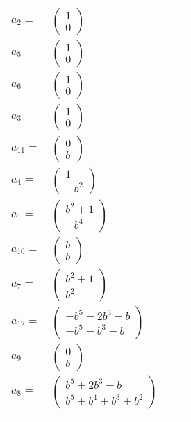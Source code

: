 \documentclass[1p]{elsarticle_modified}
\theoremstyle{definition}
\begin{document}
\begin{tabular}{m{7pt} m{180pt} m{7pt} m{180pt} }
\flushright $a_{2}=$&$\begin{pmatrix}1\\0\end{pmatrix}$ \\
\flushright $a_{5}=$&$\begin{pmatrix}1\\0\end{pmatrix}$ \\
\flushright $a_{6}=$&$\begin{pmatrix}1\\0\end{pmatrix}$ \\
\flushright $a_{3}=$&$\begin{pmatrix}1\\0\end{pmatrix}$ \\
\flushright $a_{11}=$&$\begin{pmatrix}0\\b\end{pmatrix}$ \\
\flushright $a_{4}=$&$\begin{pmatrix}1\\- b^2\end{pmatrix}$ \\
\flushright $a_{1}=$&$\begin{pmatrix}b^2+1\\- b^4\end{pmatrix}$ \\
\flushright $a_{10}=$&$\begin{pmatrix}b\\b\end{pmatrix}$ \\
\flushright $a_{7}=$&$\begin{pmatrix}b^2+1\\b^2\end{pmatrix}$ \\
\flushright $a_{12}=$&$\begin{pmatrix}- b^5-2 b^3- b\\- b^5- b^3+b\end{pmatrix}$ \\
\flushright $a_{9}=$&$\begin{pmatrix}0\\b\end{pmatrix}$ \\
\flushright $a_{8}=$&$\begin{pmatrix}b^5+2 b^3+b\\b^5+b^4+b^3+b^2\end{pmatrix}$\\&\end{tabular}
\end{document}
